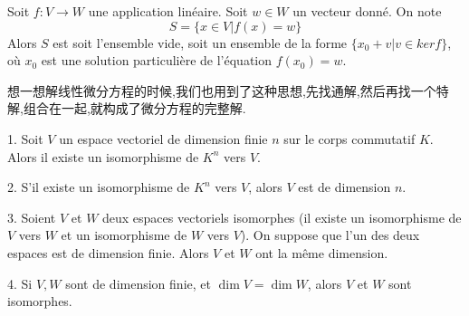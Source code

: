 \documentclass{article}
\begin{document}
\begin{theorem}
  Soit $f:V \rightarrow W$ une application lin\'eaire. Soit $w \in W$ un vecteur donn\'e. On note
  $$
  S=\{x \in V|f(x)=w\}
  $$
  Alors $S$ est soit l'ensemble vide, soit un ensemble de la forme $\{x_0+v|v \in ker f\}$, o\`u $x_0$ est une solution particuli\`ere de l'\'equation $f(x_0)=w$.
\end{theorem}
\begin{note}
  想一想解线性微分方程的时候,我们也用到了这种思想,先找通解,然后再找一个特解,组合在一起,就构成了微分方程的完整解.
\end{note}

\begin{theorem}

1. Soit $V$ un espace vectoriel de dimension finie $n$ sur le corps commutatif $K$. \\
Alors il existe un isomorphisme de $K^n$ vers $V$.
\medskip

2. S'il existe un isomorphisme de $K^n$ vers $V$, alors $V$ est de dimension $n$.

\medskip


3. Soient $V$ et $W$ deux espaces vectoriels isomorphes (il existe un isomorphisme de $V$ vers $W$ et un isomorphisme de $W$ vers $V$). On suppose que l'un des deux espaces est de dimension finie. Alors $V$ et $W$ ont la m\^eme dimension.

\medskip

4. Si $V,W$ sont de dimension finie, et $\dim V = \dim W$, alors $V$ et $W$ sont isomorphes.

\end{theorem}


\bigskip
\end{document}
